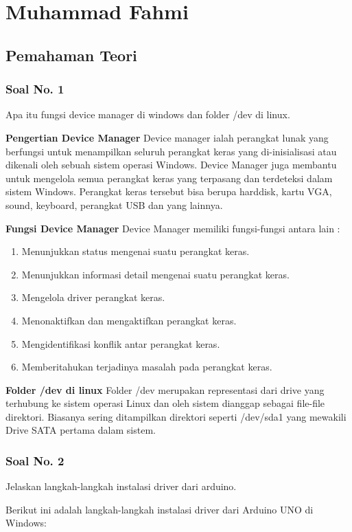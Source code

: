 \section{Muhammad Fahmi}
\subsection{Pemahaman Teori}
\subsubsection{Soal No. 1}
Apa itu fungsi device manager di windows dan folder /dev di linux.

\textbf{Pengertian Device Manager}
Device manager ialah perangkat lunak yang berfungsi untuk menampilkan seluruh perangkat keras yang di-inisialisasi atau dikenali oleh sebuah sistem operasi Windows. Device Manager juga membantu untuk mengelola semua perangkat keras yang terpasang dan terdeteksi dalam sistem Windows. Perangkat keras tersebut bisa berupa harddisk, kartu VGA, sound, keyboard, perangkat USB dan yang lainnya.

\textbf{Fungsi Device Manager}
Device Manager memiliki fungsi-fungsi antara lain :
\begin{enumerate}
	\item Menunjukkan status mengenai suatu perangkat keras.
	\item Menunjukkan informasi detail mengenai suatu perangkat keras.
	\item Mengelola driver perangkat keras.
	\item Menonaktifkan dan mengaktifkan perangkat keras.
	\item Mengidentifikasi konflik antar perangkat keras.
	\item Memberitahukan terjadinya masalah pada perangkat keras.
\end{enumerate}

\textbf{Folder /dev di linux}
Folder /dev merupakan representasi dari drive yang terhubung ke sistem operasi Linux dan oleh sistem dianggap sebagai file-file direktori. Biasanya sering ditampilkan direktori seperti /dev/sda1 yang mewakili Drive SATA pertama dalam sistem.

\subsubsection{Soal No. 2}
Jelaskan langkah-langkah instalasi driver dari arduino.

Berikut ini adalah langkah-langkah instalasi driver dari Arduino UNO di Windows:

